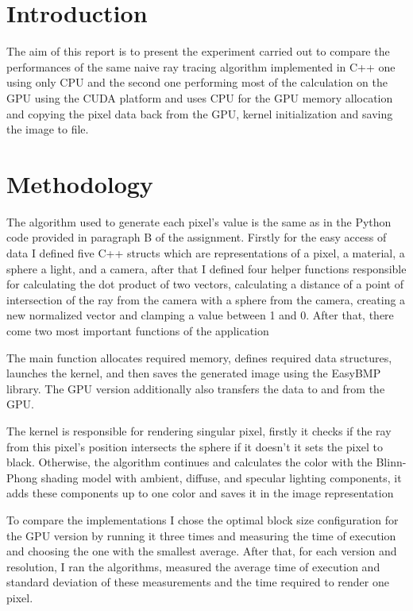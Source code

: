 \section{Introduction}

The aim of this report is to present the experiment carried out to compare the performances of the same naive ray tracing algorithm implemented in C++ one using only CPU and the second one performing most of the calculation on the GPU using the CUDA platform and uses CPU for the GPU memory allocation and copying the pixel data back from the GPU, kernel initialization and saving the image to file.

\section{Methodology}

The algorithm used to generate each pixel’s value is the same as in the Python code provided in paragraph B of the assignment. Firstly for the easy access of data I defined five C++ structs which are representations of a pixel, a material, a sphere a light, and a camera, after that I defined four helper functions responsible for calculating the dot product of two vectors, calculating a distance of a point of intersection of the ray from the camera with a sphere from the camera, creating a new normalized vector and clamping a value between 1 and 0. After that, there come two most important functions of the application 

The main function allocates required memory, defines required data structures, launches the kernel, and then saves the generated image using the EasyBMP library. The GPU version additionally also transfers the data to and from the GPU. 

The kernel is responsible for rendering singular pixel, firstly it checks if the ray from this pixel’s position intersects the sphere if it doesn’t it sets the pixel to black. Otherwise, the algorithm continues and calculates the color with the Blinn-Phong shading model with ambient, diffuse, and specular lighting components, it adds these components up to one color and saves it in the image representation

To compare the implementations I chose the optimal block size configuration for the GPU version by running it three times and measuring the time of execution and choosing the one with the smallest average. After that, for each version and resolution, I ran the algorithms, measured the average time of execution and standard deviation of these measurements and the time required to render one pixel.

